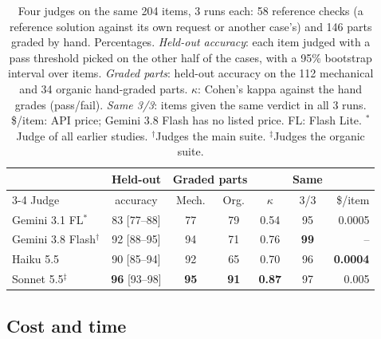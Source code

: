 \begin{table}[t]
  \centering
  \small
  \setlength{\tabcolsep}{2.4pt}
  \begin{tabular}{@{}lccccc r@{}}
    \toprule
    & Held-out & \multicolumn{2}{c}{Graded parts} & & Same & \\
    \cmidrule(lr){3-4}
    Judge & accuracy & Mech. & Org. & $\kappa$ & 3/3 & \$/item \\
    \midrule
    Gemini 3.1 FL$^{*}$ & 83 [77--88] & 77 & 79 & 0.54 & 95 & 0.0005 \\
    Gemini 3.8 Flash$^{\dagger}$ & 92 [88--95] & 94 & 71 & 0.76 & \textbf{99} & -- \\
    Haiku 5.5 & 90 [85--94] & 92 & 65 & 0.70 & 96 & \textbf{0.0004} \\
    Sonnet 5.5$^{\ddagger}$ & \textbf{96} [93--98] & \textbf{95} & \textbf{91} & \textbf{0.87} & 97 & 0.005 \\
    \bottomrule
  \end{tabular}
  \caption{Four judges on the same 204 items, 3 runs each: 58 reference checks (a reference solution against its
    own request or another case's) and 146 parts graded by hand. Percentages. \emph{Held-out accuracy}: each item
    judged with a pass threshold picked on the other half of the cases, with a 95\% bootstrap interval over items.
    \emph{Graded parts}: held-out accuracy on the 112 mechanical and 34 organic hand-graded parts. $\kappa$: Cohen's
    kappa against the hand grades (pass/fail). \emph{Same 3/3}: items given the same verdict in all 3 runs.
    \$/item: API price; Gemini 3.8 Flash has no listed price. FL: Flash Lite. $^{*}$Judge of all earlier studies.
    $^{\dagger}$Judges the main suite. $^{\ddagger}$Judges the organic suite.}
  \label{tab:judges}
\end{table}

\subsection{Cost and time}
\label{sec:res-cost}

